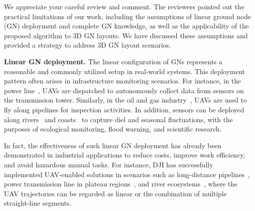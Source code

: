 \begin{metaresponse}
	We appreciate your careful review and comment.
	The reviewers pointed out the practical limitations of our work, including the assumptions of linear ground node (GN) deployment and complete GN knowledge, as well as the applicability of the proposed algorithm to 3D GN layouts.
	We have discussed these assumptions and provided a strategy to address 3D GN layout scenarios.

	\textbf{Linear GN deployment.}
	The linear configuration of GNs represents a reasonable and commonly utilized setup in real-world systems.
	This deployment pattern often arises in infrastructure monitoring scenarios.
	For instance, in the power line~\cite{powerline,transmission-line}, UAVs are dispatched to autonomously collect data from sensors on the transmission tower.
	Similarly, in the oil and gas industry~\cite{pipeline}, UAVs are used to fly along pipelines for inspection activities.
	In addition, sensors can be deployed along rivers~\cite{river} and coasts~\cite{coast} to capture diel and seasonal fluctuations, with the purposes of ecological monitoring, flood warning, and scientific research.

	In fact, the effectiveness of such linear GN deployment has already been demonstrated in industrial applications to reduce costs, improve work efficiency, and avoid hazardous manual tasks.
	For instance, DJI has successfully implemented UAV-enabled solutions in scenarios such as long-distance pipelines~\cite{DJI-pipeline}, power transmission line in plateau regions~\cite{DJI-powerline}, and river ecosystems~\cite{DJI-river}, where the UAV trajectories can be regarded as linear or the combination of multiple straight-line segments.


\end{metaresponse}
